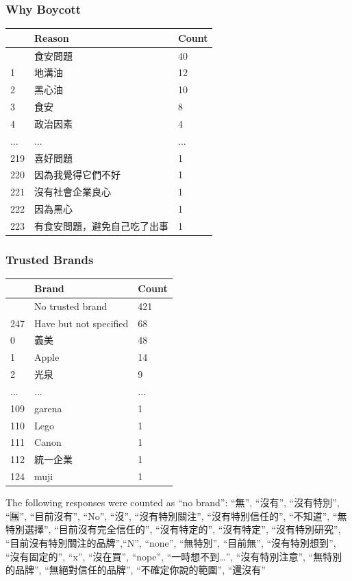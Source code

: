 \documentclass[
  12pt,
  letterpaper,
  DIV=11,
  numbers=noendperiod]{scrartcl}
\begin{document}
\subsubsection{Why Boycott}\label{why-boycott}

\begin{longtable}[]{@{}lll@{}}
\toprule\noalign{}
& Reason & Count \\
\midrule\noalign{}
\endhead
\bottomrule\noalign{}
\endlastfoot
0 & 食安問題 & 40 \\
1 & 地溝油 & 12 \\
2 & 黑心油 & 10 \\
3 & 食安 & 8 \\
4 & 政治因素 & 4 \\
... & ... & ... \\
219 & 喜好問題 & 1 \\
220 & 因為我覺得它們不好 & 1 \\
221 & 沒有社會企業良心 & 1 \\
222 & 因為黑心 & 1 \\
223 & 有食安問題，避免自己吃了出事 & 1 \\
\end{longtable}

\subsubsection{Trusted Brands}\label{trusted-brands}

\begin{longtable}[]{@{}lll@{}}
\toprule\noalign{}
& Brand & Count \\
\midrule\noalign{}
\endhead
\bottomrule\noalign{}
\endlastfoot
246 & No trusted brand & 421 \\
247 & Have but not specified & 68 \\
0 & 義美 & 48 \\
1 & Apple & 14 \\
2 & 光泉 & 9 \\
... & ... & ... \\
109 & garena & 1 \\
110 & Lego & 1 \\
111 & Canon & 1 \\
112 & 統一企業 & 1 \\
124 & muji & 1 \\
\end{longtable}

The following responses were counted as ``no brand'': ``無'', ``沒有'',
``沒有特別'', ``🈚️'', ``目前沒有'', ``No'', ``沒'', ``沒有特別關注'',
``沒有特別信任的'', ``不知道'', ``無特別選擇'', ``目前沒有完全信任的'',
``沒有特定的'', ``沒有特定'', ``沒有特別研究'',
``目前沒有特別關注的品牌'',``N'', ``none'', ``無特別'', ``目前無'',
``沒有特別想到'', ``沒有固定的'', ``x'', ``沒在買'', ``nope'',
``一時想不到\ldots{}'', ``沒有特別注意'', ``無特別的品牌'',
``無絕對信任的品牌'', ``不確定你說的範圍'', ``還沒有''
\end{document}
